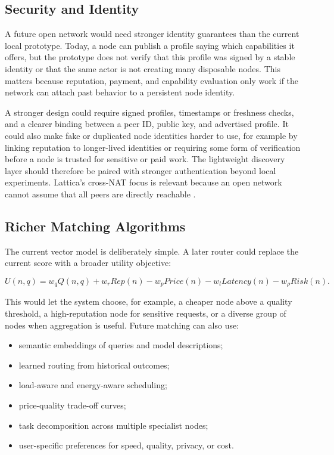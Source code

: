 \subsection{Security and Identity}

A future open network would need stronger identity guarantees than the current
local prototype. Today, a node can publish a profile saying which capabilities
it offers, but the prototype does not verify that this profile was signed by a
stable identity or that the same actor is not creating many disposable nodes.
This matters because reputation, payment, and capability evaluation only work
if the network can attach past behavior to a persistent node identity.

A stronger design could require signed profiles, timestamps or freshness
checks, and a clearer binding between a peer ID, public key, and advertised
profile. It could also make fake or duplicated node identities harder to use,
for example by linking reputation to longer-lived identities or requiring some
form of verification before a node is trusted for sensitive or paid work. The
lightweight discovery layer should therefore be paired with stronger
authentication beyond local experiments. Lattica's cross-NAT focus is relevant
because an open network cannot assume that all peers are directly reachable
\citep{yang2025lattica}.

\subsection{Richer Matching Algorithms}

The current vector model is deliberately simple. A later router could replace
the current score with a broader utility objective:

\[
  U(n,q) =
  w_q Q(n,q) + w_r Rep(n) - w_p Price(n) - w_l Latency(n) - w_\rho Risk(n).
\]

This would let the system choose, for example, a cheaper node above a quality
threshold, a high-reputation node for sensitive requests, or a diverse group of
nodes when aggregation is useful. Future matching can also use:

\begin{itemize}
  \item semantic embeddings of queries and model descriptions;
  \item learned routing from historical outcomes;
  \item load-aware and energy-aware scheduling;
  \item price-quality trade-off curves;
  \item task decomposition across multiple specialist nodes;
  \item user-specific preferences for speed, quality, privacy, or cost.
\end{itemize}


